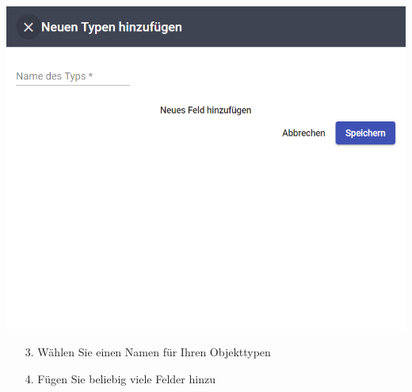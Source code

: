 \documentclass[11pt,a4paper]{report}
\begin{document}
	\begin{minipage}{0.5\linewidth}
	\includegraphics[width=\linewidth]{Objekttyp.png}
	\end{minipage}
	\hfill
	\begin{minipage}{0.4\linewidth}
	\begin{itemize}
		\item[3.] Wählen Sie einen Namen für Ihren Objekttypen
		\item[4.] Fügen Sie beliebig viele Felder hinzu
	\end{itemize}
	\end{minipage}\\
\end{document}
